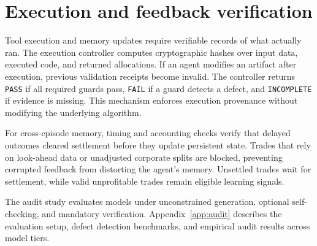 \section{Execution and feedback verification}
\label{sec:checks}
Tool execution and memory updates require verifiable records of what actually ran.
The execution controller computes cryptographic hashes over input data, executed code,
and returned allocations. If an agent modifies an artifact after execution, previous
validation receipts become invalid. The controller returns \texttt{PASS} if all required
guards pass, \texttt{FAIL} if a guard detects a defect, and \texttt{INCOMPLETE} if
evidence is missing. This mechanism enforces execution provenance without modifying the
underlying algorithm.

For cross-episode memory, timing and accounting checks verify that delayed outcomes
cleared settlement before they update persistent state. Trades that rely on look-ahead
data or unadjusted corporate splits are blocked, preventing corrupted feedback from
distorting the agent's memory. Unsettled trades wait for settlement, while valid
unprofitable trades remain eligible learning signals.

The audit study evaluates models under unconstrained generation, optional self-checking,
and mandatory verification. Appendix~\ref{app:audit} describes the evaluation setup,
defect detection benchmarks, and empirical audit results across model tiers.

